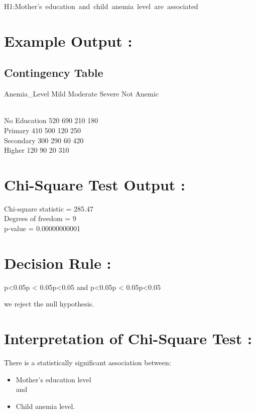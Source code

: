 \documentclass[
]{article}
\begin{document}
H1:Mother's~education~and~child~anemia~level~are~associated

\section{\texorpdfstring{\textbf{Example Output
:}}{Example Output :}}\label{example-output}

\subsection{Contingency Table}\label{contingency-table}

Anemia\_Level Mild Moderate Severe Not Anemic\\
\strut \\
No Education 520 690 210 180\\
Primary 410 500 120 250\\
Secondary 300 290 60 420\\
Higher 120 90 20 310

\section{\texorpdfstring{\textbf{Chi-Square Test Output
:}}{Chi-Square Test Output :}}\label{chi-square-test-output}

Chi-square statistic = 285.47\\
Degrees of freedom = 9\\
p-value = 0.00000000001

\section{Decision Rule :}\label{decision-rule}

p\textless0.05p \textless{} 0.05p\textless0.05 and p\textless0.05p
\textless{} 0.05p\textless0.05

we reject the null hypothesis.

\section{\texorpdfstring{\textbf{Interpretation of Chi-Square Test
:}}{Interpretation of Chi-Square Test :}}\label{interpretation-of-chi-square-test}

There is a statistically significant association between:

\begin{itemize}
\item
  Mother's education level\\
  and
\item
  Child anemia level.
\end{itemize}
\end{document}
